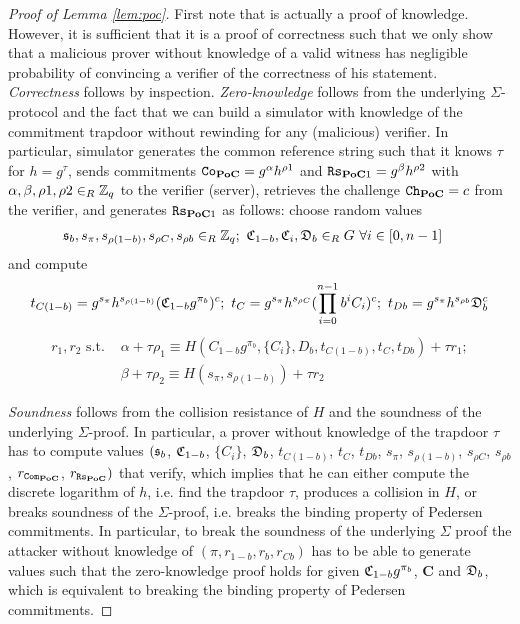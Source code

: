 
\begin{proof}[Proof of Lemma \ref{lem:poc}]
First note that \PoC is actually a proof of knowledge.
However, it is sufficient that it is a proof of correctness such that we only show that a malicious prover without knowledge of a valid witness has negligible probability of convincing a verifier of the correctness of his statement.
\emph{Correctness} follows by inspection.
\emph{Zero-knowledge} follows from the underlying $\Sigma$-protocol and the fact that we can build a simulator with knowledge of the commitment trapdoor without rewinding for any (malicious) verifier.
In particular, simulator \SIM generates the common reference string \crs such that it knows $\tau$ for $h=g^\tau$, sends commitments $\mathtt{Co}_\mathsf{\bf PoC}=g^{\alpha}h^{\rho1}$ and $\mathtt{Rs}_{\mathsf{\bf PoC}1}=g^{\beta}h^{\rho2}$ with $\alpha,\beta,\rho1,\rho2\in_R\mathbb{Z}_q$ to the verifier (server), retrieves the challenge $\mathtt{Ch}_\mathsf{\bf PoC}=c$ from the verifier, and generates $\mathtt{Rs}_{\mathsf{\bf PoC}1}$ as follows: choose random values
\begin{align*}  
  & \mathfrak{s}_b, s_\pi, s_{\rho(1-b)}, s_{\rho C}, s_{\rho b}\in_R\mathbb{Z}_q;~ \mathfrak{C}_{1-b}, \mathfrak{C}_i, \mathfrak{D}_b\in_R G~ \forall i\in[0,n-1]
\end{align*}
and compute \vspace*{-1em}
\begin{align*}  
 t_{C(1-b)}=g^{s_\pi}h^{s_{\rho(1-b)}}(\mathfrak{C}_{1-b}g^{\pi_b})^c;~ t_C=g^{s_\pi}h^{s_{\rho C}} (\prod_{i=0}^{n-1}b^i C_i)^c;~ t_{Db}=g^{s_\pi}h^{s_{\rho b}}\mathfrak{D}_b^c 
\end{align*}\vspace*{-2em}
\begin{align*}
  r_1,r_2 \text{ s.t. } & \alpha+\tau\rho_1\equiv H(C_{1-b}g^{\pi_b}, \{C_i\}, D_b, t_{C(1-b)}, t_C, t_{Db}) + \tau r_1; \\
  & \beta + \tau\rho_2 \equiv H(s_{\pi}, s_{\rho (1-b)}) + \tau r_2
\end{align*}

\noindent
\emph{Soundness} follows from the collision resistance of $H$ and the soundness of the underlying $\Sigma$-proof.
In particular, a prover without knowledge of the trapdoor $\tau$ has to compute values $(\mathfrak{s}_b$, $\mathfrak{C}_{1-b}$, $\{C_i\}$, $\mathfrak{D}_b$, $t_{C(1-b)}$, $t_C$, $t_{Db}$, $s_{\pi}$, $s_{\rho (1-b)}$, $s_{\rho C}$, $s_{\rho b}$, $r_{\mathtt{Com}_{\mathsf{\bf PoC}}}$, $r_{\mathtt{Rs}_{\mathsf{\bf PoC}}})$ that verify, which implies that he can either compute the discrete logarithm of $h$, i.e. find the trapdoor $\tau$, produces a collision in $H$, or breaks soundness of the $\Sigma$-proof, i.e. breaks the binding property of Pedersen commitments.
In particular, to break the soundness of the underlying $\Sigma$ proof the attacker without knowledge of $(\pi,r_{1-b},r_b,r_{Cb})$ has to be able to generate values such that the \PoC zero-knowledge proof holds for given $\mathfrak{C}_{1-b}g^{\pi_b}$, $\bm C$ and $\mathfrak{D}_b$, which is equivalent to breaking the binding property of Pedersen commitments.
\end{proof}

